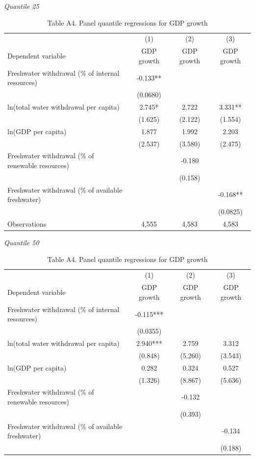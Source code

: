 \begin{table}[htbp]
\centering
\caption{Table A4. Panel quantile regressions for GDP growth}
\small
\textit{Quantile 25}\\
\begin{tabular}{lccc}
\hline
 & (1) & (2) & (3) \\
Dependent variable & GDP growth & GDP growth & GDP growth \\
\hline
Freshwater withdrawal (\% of internal resources) & -0.133** &  &  \\
 & (0.0680) &  &  \\
ln(total water withdrawal per capita) & 2.745* & 2.722 & 3.331** \\
 & (1.625) & (2.122) & (1.554) \\
ln(GDP per capita) & 1.877 & 1.992 & 2.203 \\
 & (2.537) & (3.580) & (2.475) \\
Freshwater withdrawal (\% of renewable resources) &  & -0.180 &  \\
 &  & (0.158) &  \\
Freshwater withdrawal (\% of available freshwater) &  &  & -0.168** \\
 &  &  & (0.0825) \\
\hline
Observations & 4,555 & 4,583 & 4,583 \\
\hline
\end{tabular}
\vspace{0.75em}
\textit{Quantile 50}\\
\begin{tabular}{lccc}
\hline
 & (1) & (2) & (3) \\
Dependent variable & GDP growth & GDP growth & GDP growth \\
\hline
Freshwater withdrawal (\% of internal resources) & -0.115*** &  &  \\
 & (0.0355) &  &  \\
ln(total water withdrawal per capita) & 2.940*** & 2.759 & 3.312 \\
 & (0.848) & (5.260) & (3.543) \\
ln(GDP per capita) & 0.282 & 0.324 & 0.527 \\
 & (1.326) & (8.867) & (5.636) \\
Freshwater withdrawal (\% of renewable resources) &  & -0.132 &  \\
 &  & (0.393) &  \\
Freshwater withdrawal (\% of available freshwater) &  &  & -0.134 \\
 &  &  & (0.188) \\

\end{tabular}
\end{table}
